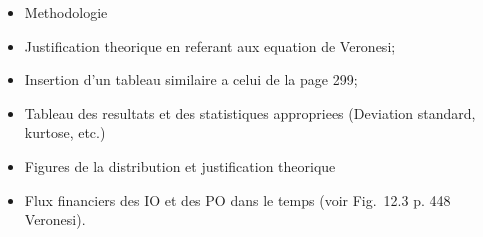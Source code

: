 \begin{itemize}
\item Methodologie
\item Justification theorique en referant aux equation de Veronesi;
\item Insertion d'un tableau similaire a celui de la page 299;
\item Tableau des resultats et des statistiques appropriees (Deviation standard, kurtose,
  etc.)
\item Figures de la distribution et justification theorique
\item Flux financiers des IO et des PO dans le temps (voir Fig.~12.3 p. 448
  Veronesi).\cite{diebold,brigo}
\end{itemize}

\small

\normalsize

